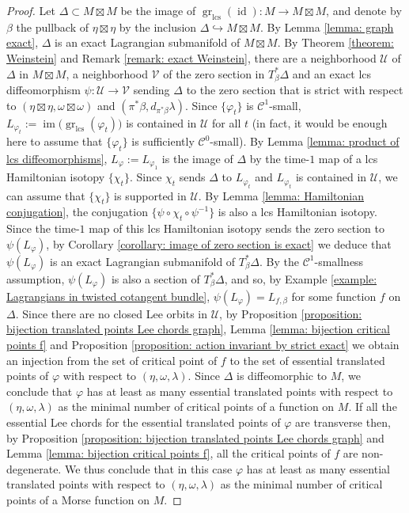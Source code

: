 \documentclass{amsart}
\DeclareMathOperator{\gr}{gr}
\DeclareMathOperator{\lcs}{lcs}
\DeclareMathOperator{\im}{im}
\DeclareMathOperator{\id}{id}
\theoremstyle{remark}
\begin{document}
\begin{proof}
Let $\Delta \subset M \boxtimes M$
be the image of $\gr_{\lcs} (\id): M \rightarrow M \boxtimes M$,
and denote by $\beta$ the pullback of $\eta \boxtimes \eta$
by the inclusion $\Delta \hookrightarrow M \boxtimes M$.
By Lemma \ref{lemma: graph exact},
$\Delta$ is an exact Lagrangian submanifold
of $M \boxtimes M$.
By Theorem \ref{theorem: Weinstein}
and Remark \ref{remark: exact Weinstein},
there are a neighborhood $\mathcal{U}$
of $\Delta$ in $M \boxtimes M$,
a neighborhood $\mathcal{V}$ of the zero section in $T_{\beta}^{\ast}\Delta$
and an exact lcs diffeomorphism $\psi: \mathcal{U} \rightarrow \mathcal{V}$
sending $\Delta$ to the zero section
that is strict  with respect to $(\eta \boxtimes \eta, \omega \boxtimes \omega)$
and $(\pi^{\ast}\beta, d_{\pi^{\ast}\beta} \lambda)$.
Since $\{\varphi_t\}$ is $\mathcal{C}^1$-small,
$L_{\varphi_t} := \im \big(\gr_{\lcs} (\varphi_t)\big)$
is contained in $\mathcal{U}$ for all $t$
(in fact, it would be enough here to assume
that $\{\varphi_t\}$ is sufficiently $\mathcal{C}^0$-small).
By Lemma \ref{lemma: product of lcs diffeomorphisms},
$L_{\varphi} := L_{\varphi_1}$ is the image of $\Delta$
by the time-$1$ map of a lcs Hamiltonian isotopy $\{\chi_t\}$.
Since $\chi_t$ sends $\Delta$ to $L_{\varphi_t}$
and $L_{\varphi_t}$ is contained in $\mathcal{U}$,
we can assume that $\{\chi_t\}$ is supported in $\mathcal{U}$.
By Lemma \ref{lemma: Hamiltonian conjugation},
the conjugation $\{\psi \circ \chi_t \circ \psi^{-1}\}$
is also a lcs Hamiltonian isotopy.
Since the time-$1$ map of this lcs Hamiltonian isotopy
sends the zero section to $\psi(L_{\varphi})$,
by Corollary \ref{corollary: image of zero section is exact}
we deduce that $\psi(L_{\varphi})$
is an exact Lagrangian submanifold of $T_{\beta}^{\ast}\Delta$.
By the $\mathcal{C}^1$-smallness assumption,
$\psi (L_{\varphi})$ is also a section of $T_{\beta}^{\ast}\Delta$,
and so, by Example \ref{example: Lagrangians in twisted cotangent bundle},
$\psi(L_{\varphi}) = L_{f, \beta}$
for some function $f$ on $\Delta$.
Since there are no closed Lee orbits in $\mathcal{U}$,
by Proposition \ref{proposition: bijection translated points Lee chords graph},
Lemma \ref{lemma: bijection critical points f}
and Proposition \ref{proposition: action invariant by strict exact}
we obtain an injection from the set of critical point of $f$
to the set of essential translated points of $\varphi$
with respect to $(\eta, \omega, \lambda)$.
Since $\Delta$ is diffeomorphic to $M$,
we conclude that $\varphi$
has at least as many essential translated points
with respect to $(\eta, \omega, \lambda)$
as the minimal number of critical points
of a function on $M$.
If all the essential Lee chords
for the essential translated points of $\varphi$
are transverse then,
by Proposition \ref{proposition: bijection translated points Lee chords graph}
and Lemma \ref{lemma: bijection critical points f},
all the critical points of $f$ are non-degenerate.
We thus conclude that in this case 
$\varphi$ has at least as many essential translated points
with respect to $(\eta, \omega, \lambda)$
as the minimal number of critical points
of a Morse function on $M$.
\end{proof}
\end{document}
